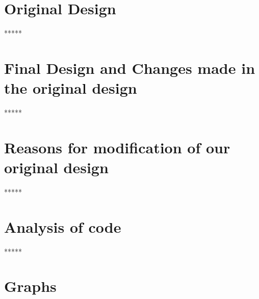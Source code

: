 \documentclass{report}
\begin{document}
\section{Original Design}
*****
\section{Final Design and Changes made in the original design}
*****
\section{Reasons for modification of our original design}
*****
\section{Analysis of code}
*****
\section{Graphs}



\end{document}
